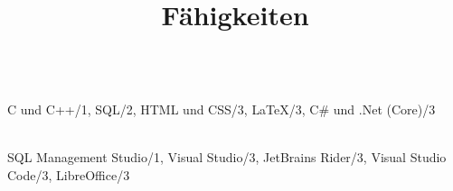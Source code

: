 \title{Fähigkeiten}
\makecvtitle
\begin{multicols}{2}
\\
\vspace{0.25cm}
\skills
{
    {C und C++/1},
    {SQL/2},
    {HTML und CSS/3},
    {\LaTeX{}/3},
    {C\# und .Net (Core)/3}%
}\\
\vspace{0.5cm}

\columnbreak

\\
\vspace{0.25cm}
\skills
{
    {SQL Management Studio/1},
    {Visual Studio/3},
    {JetBrains Rider/3},
    {Visual Studio Code/3},
    {LibreOffice/3}%
}\\
\vspace{0.75cm}
\end{multicols}

\begin{multicols}{2}
\\
\vspace{0.25cm}
\\
\vspace{0.5cm}


\columnbreak


\\
\vspace{0.25cm}
\\
\vspace{0.5cm}
\end{multicols}
